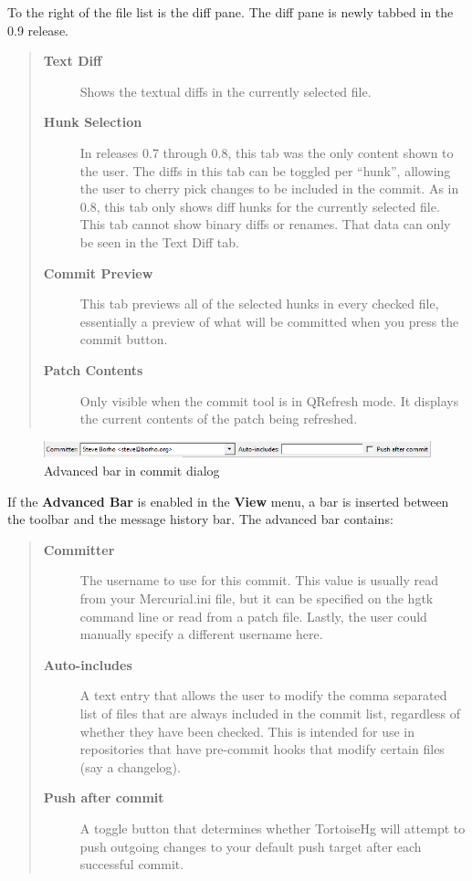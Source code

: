 \documentclass[letterpaper,10pt,english]{manual}
\begin{document}
To the right of the file list is the diff pane.  The diff pane is newly
tabbed in the 0.9 release.
\begin{quote}
\begin{description}
\item[\textbf{Text Diff}]
Shows the textual diffs in the currently selected file.

\item[\textbf{Hunk Selection}]
In releases 0.7 through 0.8, this tab was the only content shown
to the user.  The diffs in this tab can be toggled per ``hunk'',
allowing the user to cherry pick changes to be included in the
commit.  As in 0.8, this tab only shows diff hunks for the
currently selected file.  This tab cannot show binary diffs or
renames.  That data can only be seen in the Text Diff tab.

\item[\textbf{Commit Preview}]
This tab previews all of the selected hunks in every checked
file, essentially a preview of what will be committed when you
press the commit button.

\item[\textbf{Patch Contents}]
Only visible when the commit tool is in QRefresh mode.  It
displays the current contents of the patch being refreshed.

\end{description}
\end{quote}
\begin{figure}[htbp]
\centering

\includegraphics{advancedbar.png}
\caption{Advanced bar in commit dialog}\end{figure}

If the \textbf{Advanced Bar} is enabled in the \textbf{View} menu,
a bar is inserted between the toolbar and the message history bar.  The
advanced bar contains:
\begin{quote}
\begin{description}
\item[\textbf{Committer}]
The username to use for this commit.  This value is usually read
from your Mercurial.ini file, but it can be specified on the
hgtk command line or read from a patch file.  Lastly, the user
could manually specify a different username here.

\item[\textbf{Auto-includes}]
A text entry that allows the user to modify the comma separated
list of files that are always included in the commit list,
regardless of whether they have been checked.  This is intended
for use in repositories that have pre-commit hooks that modify
certain files (say a changelog).

\item[\textbf{Push after commit}]
A toggle button that determines whether TortoiseHg will attempt
to push outgoing changes to your default push target after each
successful commit.

\end{description}
\end{quote}
\end{document}
